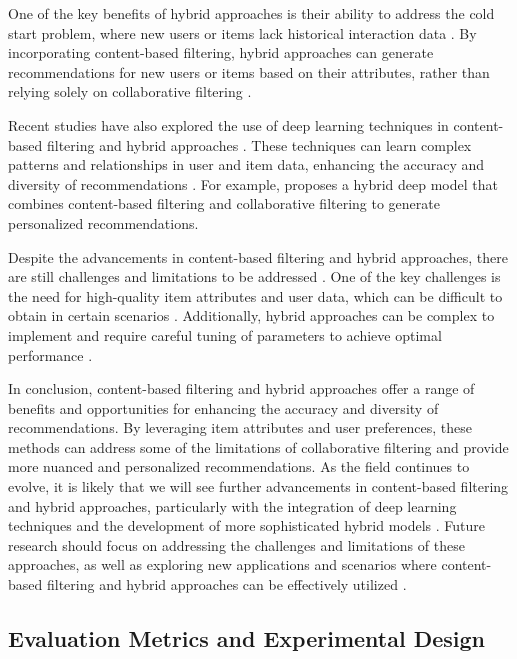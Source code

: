 \documentclass[11pt,a4paper]{article}
\begin{document}
One of the key benefits of hybrid approaches is their ability to address the cold start problem, where new users or items lack historical interaction data \cite{doi:10.3390/app9091894}. By incorporating content-based filtering, hybrid approaches can generate recommendations for new users or items based on their attributes, rather than relying solely on collaborative filtering \cite{doi:10.1609/aaai.v32i1.11689}.

Recent studies have also explored the use of deep learning techniques in content-based filtering and hybrid approaches \cite{doi:10.1155/2022/9593957}. These techniques can learn complex patterns and relationships in user and item data, enhancing the accuracy and diversity of recommendations \cite{doi:10.1007/s00521-022-08088-2}. For example, \cite{doi:10.24963/ijcai.2017/446} proposes a hybrid deep model that combines content-based filtering and collaborative filtering to generate personalized recommendations.

Despite the advancements in content-based filtering and hybrid approaches, there are still challenges and limitations to be addressed \cite{doi:10.1145/3434185}. One of the key challenges is the need for high-quality item attributes and user data, which can be difficult to obtain in certain scenarios \cite{doi:10.1145/3394486.3403226}. Additionally, hybrid approaches can be complex to implement and require careful tuning of parameters to achieve optimal performance \cite{doi:10.1609/aaai.v34i04.5751}.

In conclusion, content-based filtering and hybrid approaches offer a range of benefits and opportunities for enhancing the accuracy and diversity of recommendations. By leveraging item attributes and user preferences, these methods can address some of the limitations of collaborative filtering and provide more nuanced and personalized recommendations. As the field continues to evolve, it is likely that we will see further advancements in content-based filtering and hybrid approaches, particularly with the integration of deep learning techniques and the development of more sophisticated hybrid models \cite{arxiv:1905.01997}. Future research should focus on addressing the challenges and limitations of these approaches, as well as exploring new applications and scenarios where content-based filtering and hybrid approaches can be effectively utilized \cite{arxiv:2206.04415}.


\subsection{Evaluation Metrics and Experimental Design}
\end{document}
